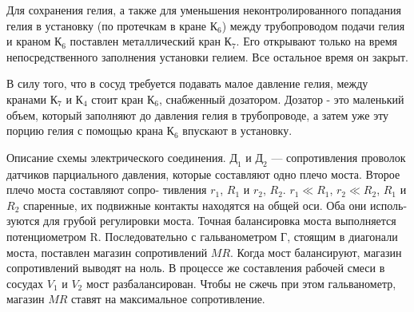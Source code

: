 \documentclass[a4paper,12pt]{article}
\begin{document}
Для сохранения гелия, а также для уменьшения неконтролированного попадания гелия в установку (по протечкам в кране $К_6$) между
трубопроводом подачи гелия и краном $К_6$ поставлен металлический
кран $К_7$. Его открывают только на время непосредственного заполнения установки гелием. Все остальное время он закрыт.

В силу того, что в сосуд требуется подавать малое давление гелия,
между кранами $К_7$ и $К_4$ стоит кран $К_6$, снабженный дозатором. Дозатор - это маленький объем, который заполняют до давления гелия в трубопроводе, а затем уже эту порцию гелия с помощью крана $К_6$ впускают в установку.

Описание схемы электрического соединения. $Д_1$ и $Д_2$ — сопротивления проволок датчиков парциального давления, которые составляют одно плечо моста. Второе плечо моста составляют сопро- тивления $r_1$, $R_1$ и $r_2$, $R_2$. $r_1 \ll R_1$, $r_2 \ll R_2$, $R_1$ и $R_2$ спаренные, их подвижные контакты находятся на общей оси. Оба они исполь- зуются для грубой регулировки моста. Точная балансировка моста выполняется потенциометром R. Последовательно с гальванометром $Г$, стоящим в диагонали моста, поставлен магазин сопротивлений $MR$. Когда мост балансируют, магазин сопротивлений выводят на ноль. В процессе же составления рабочей смеси в сосудах $V_1$ и $V_2$ мост разбалансирован. Чтобы не сжечь при этом гальванометр, магазин $MR$ ставят на максимальное сопротивление.
\end{document}
